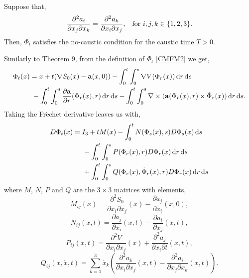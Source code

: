 \documentclass[a4paper,12pt,draft]{report}
\begin{document}
\theorem
{
Suppose that,
\begin{equation}
\frac{\partial^2 a_i}{\partial x_j \partial x_k} = \frac{\partial^2 a_k}{\partial x_i \partial x_j}, \hspace{0.3cm} \text{for } i, j, k \in \{1, 2, 3\}. \label{MFC}
\end{equation}
Then, $\Phi_t$ satisfies the no-caustic condition for the caustic time $T > 0$.
}
\proof
{
Similarly to Theorem 9, from the definition of $\Phi_t$ \eqref{CMFM2} we get,
\begin{align}
\Phi_t(x) & = x + t(\nabla S_0(x) - \mathbf{a}(x, 0)) - \int_0^t\int_0^s\nabla V(\Phi_r(x))\,\mathrm{d}r\,\mathrm{d}s\nonumber\\
& \hspace{0.1cm} - \int_0^t\int_0^s\frac{\partial \mathbf{a}}{\partial r}(\Phi_r(x), r)\,\mathrm{d}r\,\mathrm{d}s - \int_0^t\int_0^s\nabla\times(\mathbf{a}(\Phi_r(x), r)\times\dot{\Phi}_r(x))\,\mathrm{d}r\,\mathrm{d}s.\nonumber
\end{align}
Taking the Fr$\mathrm{\acute{e}}$chet derivative leaves us with,
\begin{align}
D\Phi_t(x) & = I_3 + tM(x) - \int_0^tN(\Phi_s(x), s)D\Phi_s(x)\,\mathrm{d}s\nonumber\\
& \hspace{0.5cm} - \int_0^t\int_0^sP(\Phi_r(x), r)D\Phi_r(x)\,\mathrm{d}r\,\mathrm{d}s\nonumber\\
& \hspace{0.5cm} + \int_0^t\int_0^sQ(\Phi_r(x), \dot{\Phi}_r(x), r)D\Phi_r(x)\,\mathrm{d}r\,\mathrm{d}s\nonumber
\end{align}
where $M$, $N$, $P$ and $Q$ are the $3 \times 3$ matrices with elements,
$$
M_{ij}(x) = \frac{\partial^2S_0}{\partial x_i \partial x_j}(x) - \frac{\partial a_j}{\partial x_i}(x, 0),
$$
$$
N_{ij}(x, t) = \frac{\partial a_j}{\partial x_i}(x, t) - \frac{\partial a_i}{\partial x_j}(x, t),
$$
$$
P_{ij}(x, t) = \frac{\partial^2V}{\partial x_i \partial x_j}(x) + \frac{\partial^2a_j}{\partial x_i \partial t}(x, t),
$$
$$
Q_{ij}(x, \dot{x}, t) = \sum_{k = 1}^3\dot{x}_k\left(\frac{\partial^2a_k}{\partial x_i \partial x_j}(x, t) - \frac{\partial^2a_i}{\partial x_j \partial x_k}(x, t)\right).
$$

}
\end{document}
